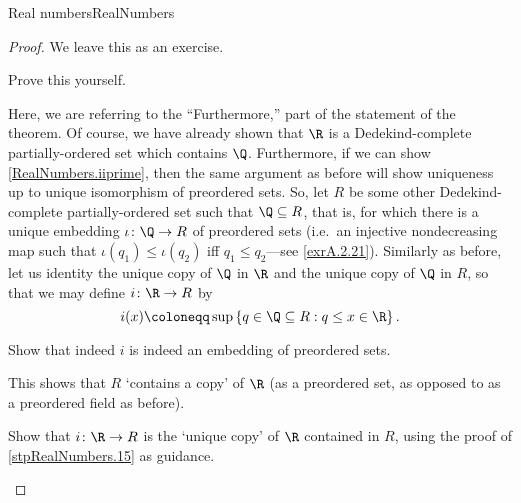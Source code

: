 \begin{thm}{Real numbers}{RealNumbers}
\begin{proof}
We leave this as an exercise.
\begin{exr}[breakable=false]{}{}
Prove this yourself.
\end{exr}

Here, we are referring to the ``Furthermore,\textellipsis '' part of the statement of the theorem.  Of course, we have already shown that $\R$ is a Dedekind-complete partially-ordered set which contains $\Q$.  Furthermore, if we can show \cref{RealNumbers.iiprime}, then the same argument as before will show uniqueness up to unique isomorphism of preordered sets.  So, let $R$ be some other Dedekind-complete partially-ordered set such that $\Q \subseteq R$, that is, for which there is a unique embedding $\iota \colon \Q \rightarrow R$ of preordered sets (i.e.~an injective nondecreasing map such that $\iota (q_1)\leq \iota (q_2)$ iff $q_1\leq q_2$---see \cref{exrA.2.21}).  Similarly as before, let us identity the unique copy of $\Q$ in $\R$ and the unique copy of $\Q$ in $R$, so that we may define $i\colon \R \rightarrow R$ by
\begin{equation}
i(x)\coloneqq \sup \left\{ q\in \Q \subseteq R:q\leq x\in \R \right\} .
\end{equation}
\begin{exr}[breakable=false]{}{}
Show that indeed $i$ is indeed an embedding of preordered sets.
\end{exr}
This shows that $R$ `contains a copy' of $\R$ (as a preordered set, as opposed to as a preordered field as before).
\begin{exr}[breakable=false]{}{}
Show that $i\colon \R \rightarrow R$ is the `unique copy' of $\R$ contained in $R$, using the proof of \cref{stpRealNumbers.15} as guidance.
\end{exr}
\end{proof}
\end{thm}

